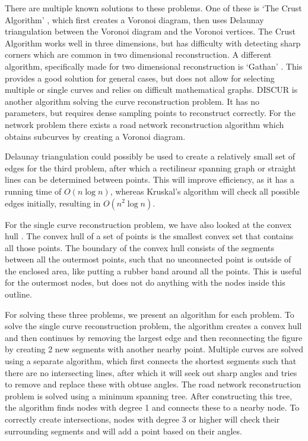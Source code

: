 \documentclass[11pt]{article}
\begin{document}
There are multiple known solutions to these problems. One of these is `The Crust Algorithm' \cite{crust}, which first creates a Voronoi diagram, then uses Delaunay triangulation between the Voronoi diagram and the Voronoi vertices. The Crust Algorithm works well in three dimensions, but has difficulty with detecting sharp corners which are common in two dimensional reconstruction.
A different algorithm, specifically made for two dimensional reconstruction is `Gathan' \cite{gathan}. This provides a good solution for general cases, but does not allow for selecting multiple or single curves and relies on difficult mathematical graphs.
DISCUR \cite{discur} is another algorithm solving the curve reconstruction problem. It has no parameters, but requires dense sampling points to reconstruct correctly.
For the network problem there exists a road network reconstruction algorithm \cite{chen} which obtains subcurves by creating a Voronoi diagram.

Delaunay triangulation could possibly be used to create a relatively small set of edges for the third problem, after which a rectilinear spanning graph or straight lines can be determined between points. This will improve efficiency, as it has a running time of $O(n \log{n})$, whereas Kruskal's algorithm will check all possible edges initially, resulting in $O(n^2 \log{n})$.

For the single curve reconstruction problem, we have also looked at the convex hull \cite{convex}. The convex hull of a set of points is the smallest convex set that contains all those points. The boundary of the convex hull consists of the segments between all the outermost points, such that no unconnected point is outside of the enclosed area, like putting a rubber band around all the points. This is useful for the outermost nodes, but does not do anything with the nodes inside this outline.

For solving these three problems, we present an algorithm for each problem.
To solve the single curve reconstruction problem, the algorithm creates a convex hull and then continues by removing the largest edge and then reconnecting the figure by creating 2 new segments with another nearby point.
Multiple curves are solved using a separate algorithm, which first connects the shortest segments such that there are no intersecting lines, after which it will seek out sharp angles and tries to remove and replace these with obtuse angles.
The road network reconstruction problem is solved using a minimum spanning tree. After constructing this tree, the algorithm finds nodes with degree 1 and connects these to a nearby node. To correctly create intersections, nodes with degree 3 or higher will check their surrounding segments and will add a point based on their angles.
\end{document}
